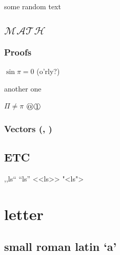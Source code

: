 \documentclass{trlnotes}
\begin{document}
some random text

\blinddocument

\section{$\mathcal{M\!AT\!H}$\underdev}

\subsection{Proofs}
\label{sub:proofs}


\begin{tproof}[kek?]
  $\sin\pi=0$ (o'rly?)
  \begin{lproof}[nested]
    another one
    \begin{pproof}
      $\Pi\neq\pi$
      {%
        \fboxsep=0pt
        \fbox{$\bigcirc$}\fbox{$\mathord{\Rightarrow}\vphantom{<}$}
      }%
      \circlearound{$\mathord{\Rightarrow}\vphantom{>}$}%
      $\circlearound{\alpha}\,\circlearound{1}$
    \end{pproof}
  \end{lproof}
\end{tproof}

\subsection{Vectors (\coori, \conori)}

\section{ETC}
,,ls`` "`ls"' <<ls>> "<ls">

\appendix
\chapter{letter}
\section{small roman latin `a'}
\end{document}
